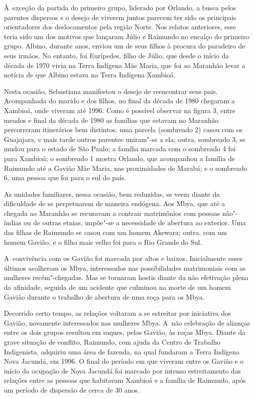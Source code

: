 À~exceção da partida do primeiro grupo, liderado por Orlando, a busca
pelos parentes dispersos e o desejo de viverem juntos parecem ter sido
os principais orientadores dos deslocamentos pela região Norte. Nos
relatos anteriores, esse teria sido um dos motivos que lançaram Júlio e
Raimundo no encalço do primeiro grupo. Albino, durante anos, enviou um
de seus filhos à procura do paradeiro de seus irmãos. No entanto, foi
Eurípedes, filho de Júlio, que desde o início da década de 1970 vivia na
Terra Indígena Mãe Maria, que foi ao Maranhão levar a notícia de que
Albino estava na Terra Indígena Xambioá.

Nesta ocasião, Sebastiana manifestou o desejo de reencontrar seus pais.
Acompanhada do marido e dos filhos, no final da década de 1980 chegaram
a Xambioá, onde viveram até 1996. Como é possível observar na figura 3,
entre meados e final da década de 1980 as famílias que estavam no
Maranhão percorreram itinerários bem distintos: uma parcela (sombreado
2) casou com os Guajajara, e mais tarde outros parentes uniram"-se a ela; 
outra, sombreado 3, se mudou para o estado de São Paulo; a
família marcada com o sombreado 4 foi para Xambioá; o sombreado 1
mostra Orlando, que acompanhou a família de Raimundo até a  Gavião
Mãe Maria, nas proximidades de Marabá; e o sombreado 6, uma pessoa que
foi para o sul do país.

As unidades familiares, nessa ocasião, bem reduzidas, se veem diante da
dificuldade de se perpetuarem de maneira endógena. Aos Mbya, que até a
chegada ao Maranhão se recusavam a contrair matrimônios com pessoas
não"-índias ou de outras etnias, impõe"-se a necessidade de abertura ao
exterior. Uma das filhas de Raimundo se casou com um homem Akewara;
outra, com um homem Gavião, e o filho mais velho foi para o Rio Grande
do Sul. 

A~convivência com os Gavião foi marcada por altos e baixos. Inicialmente
esses últimos acolheram os Mbya, interessados nas possibilidades
matrimoniais com as mulheres recém"-chegadas. Mas se tornaram hostis
diante da não efetivação plena da afinidade, seguida de um acidente que
culminou na morte de um homem Gavião durante o trabalho de abertura de
uma roça para os Mbya.

Decorrido certo tempo, as relações voltaram a se estreitar por
iniciativa dos Gavião, novamente interessados nas mulheres Mbya. A~não
celebração de alianças entre os dois grupos resultou em saques, pelos
Gavião, às roças Mbya. Diante da grave situação de conflito, Raimundo,
com ajuda da  Centro de Trabalho Indigenista, adquiriu uma área de
fazenda, na qual fundaram a Terra Indígena Nova Jacundá, em 1996. O
final do período em que viveram entre os Gavião e o início da ocupação
de Nova Jacundá foi marcado por intenso estreitamento das relações
entre as pessoas que habitavam Xambioá e a família de Raimundo, após um
período de dispersão de cerca de 30 anos.

